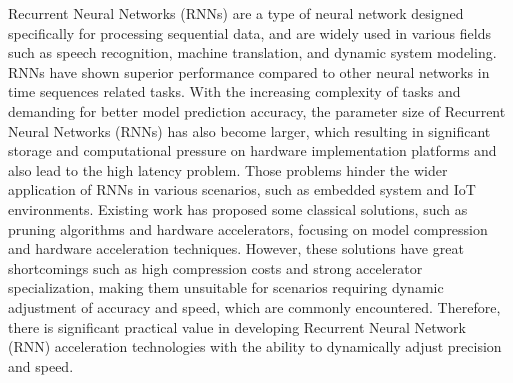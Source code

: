 
\begin{englishabstract}
Recurrent Neural Networks (RNNs) are a type of neural network designed specifically for processing sequential data, 
and are widely used in various fields such as speech recognition, machine translation, and dynamic system modeling. 
RNNs have shown superior performance compared to other neural networks in time sequences related tasks.
With the increasing complexity of tasks and demanding for better model prediction accuracy, the parameter size of 
Recurrent Neural Networks (RNNs) has also become larger, which resulting 
in significant storage and computational pressure on hardware implementation platforms and also lead to the high latency problem. 
Those problems hinder the wider application of RNNs in various scenarios, such as embedded system and IoT environments.
Existing work has proposed some classical solutions, such as pruning algorithms and hardware accelerators, focusing on 
model compression and hardware acceleration techniques. 
However, these solutions have great shortcomings such as high compression costs and strong accelerator specialization, 
making them unsuitable for scenarios requiring dynamic adjustment of accuracy and speed, which are commonly encountered. 
Therefore, there is significant practical value in developing Recurrent Neural Network (RNN) acceleration technologies with 
the ability to dynamically adjust precision and speed.


\end{englishabstract}
